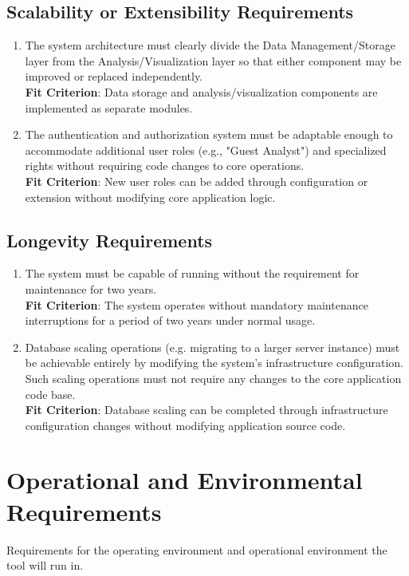 \documentclass[12pt]{article}
\begin{document}
\subsection{Scalability or Extensibility Requirements}
\begin{enumerate}[label=PR-SE\arabic*]
  \item The system architecture must clearly divide the Data Management/Storage layer from the Analysis/Visualization layer so that either component may be improved or replaced independently.
  \\ \textbf{Fit Criterion}: Data storage and analysis/visualization components are implemented as separate modules.
  \item The authentication and authorization system must be adaptable enough to accommodate additional user roles (e.g., "Guest Analyst") and specialized rights without requiring code changes to core operations.
  \\ \textbf{Fit Criterion}: New user roles can be added through configuration or extension without modifying core application logic.
\end{enumerate}
\subsection{Longevity Requirements}
\begin{enumerate}[label=PR-LR\arabic*]
  \item The system must be capable of running without the requirement for maintenance for two years.
  \\ \textbf{Fit Criterion}: The system operates without mandatory maintenance interruptions for a period of two years under normal usage.
  \item Database scaling operations (e.g. migrating to a larger server instance) must be achievable entirely by modifying the system's infrastructure configuration. Such scaling operations must not require any changes to the core application code base.
  \\ \textbf{Fit Criterion}: Database scaling can be completed through infrastructure configuration changes without modifying application source code.
\end{enumerate}

\section{Operational and Environmental Requirements}
Requirements for the operating environment and operational environment the tool will run in.
\end{document}
